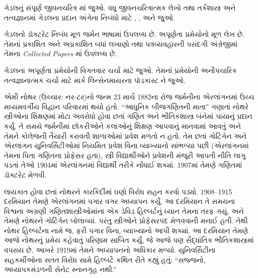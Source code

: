 \begin{reading}
ગેડલનું સંપૂર્ણ જીવનચરિત્ર
\citet{Dawson1997}માં જુઓ. વધુ જીવનચરિત્રાત્મક
લેખો તથા તર્કશાસ્ત્ર અને તત્વજ્ઞાનમાં
ગેડલના પ્રદાન અંગેના નિબંધો માટે
\citet{Wang1990}, \citet{Baaz2011},
\citet{Takeuti2003} અને \citet{Sigmund2007} જુઓ.

ગેડલનો ડૉક્ટરેટ નિબંધ મૂળ જર્મન
ભાષામાં \citep{Godel1929} ઉપલબ્ધ છે.
અપૂર્ણતા પ્રમેયોનો મૂળ લેખ
\citep{Godel1931} છે. તેમનાં
પ્રકાશિત અને અપ્રકાશિત બધાં
લખાણો તથા પત્રવ્યવહારની પસંદગી
અંગ્રેજીમાં તેમના
\emph{Collected Papers}
\citet{Godel1986,Godel1990}માં ઉપલબ્ધ છે.

ગેડલના અપૂર્ણતા પ્રમેયોની
વિગતવાર ચર્ચા માટે
\citet{Smith2013} જુઓ.
તેમનાં પ્રમેયોની અનૌપચારિક
તત્વજ્ઞાનાત્મક ચર્ચા માટે
માર્ક લિન્સેનમાયરના પૉડકાસ્ટ
\citep{Linsenmayer2014}ને જુઓ.
\end{reading}
\endgroup


\begingroup
\makeatletter{}\makeatother


\label{guunit:OLP-0626}



એમી નોથર (ઉચ્ચાર: નર-ટર)નો જન્મ 23 માર્ચ
1882ના રોજ જર્મનીના એરલાંગનમાં ઉચ્ચ
મધ્યમવર્ગીય વિદ્વાન પરિવારમાં થયો હતો.
“આધુનિક બીજગણિતની માતા” ગણાતાં નોથરે
સ્ત્રીઓના શિક્ષણમાં મોટા અવરોધો હોવા છતાં
ગણિત અને ભૌતિકશાસ્ત્ર બંનેમાં પાયાનું
પ્રદાન કર્યું. તે સમયે જર્મનીમાં છોકરીઓને
કલાઓનું શિક્ષણ આપવાનું માનવામાં આવતું અને
તેમને કોલેજની તૈયારી કરાવતી શાળાઓમાં
પ્રવેશ મળતો ન હતો. તેમ છતાં ગોટિંગેન
અને એરલાંગન યુનિવર્સિટીઓમાં નિયમિત
પ્રવેશ વિના વ્યાખ્યાનો સાંભળ્યા પછી
(એરલાંગનમાં તેમના પિતા ગણિતના પ્રોફેસર
હતા), સ્ત્રી વિદ્યાર્થીઓને પ્રવેશની
મંજૂરી આપતી નીતિ લાગુ પડતાં તેઓ
1904માં એરલાંગનમાં વિદ્યાર્થી તરીકે
નોંધાઈ શક્યાં. 1907માં તેમણે ગણિતમાં
ડૉક્ટરેટ મેળવી.

લાયકાત હોવા છતાં નોથરને કારકિર્દીમાં
ઘણો વિરોધ સહન કરવો પડ્યો. 1908--1915
દરમિયાન તેમણે એરલાંગનમાં પગાર વગર
અધ્યાપન કર્યું. આ દરમિયાન તે સમયના
વિશ્વના અગ્રણી ગણિતશાસ્ત્રીઓમાંના
એક ડેવિડ હિલ્બર્ટનું ધ્યાન તેમના
તરફ ગયું, અને તેમણે નોથરને ગોટિંગેન
બોલાવ્યાં. પરંતુ સ્ત્રીઓને પ્રોફેસરપદ
મેળવવાની મનાઈ હતી. તેથી નોથર
હિલ્બર્ટના નામે જ, ફરી પગાર વિના,
વ્યાખ્યાનો આપી શક્યાં. આ દરમિયાન
તેમણે આજે નોથરનું પ્રમેય કહેવાતું
પરિણામ સાબિત કર્યું, જે આજે પણ
સૈદ્ધાંતિક ભૌતિકશાસ્ત્રમાં વપરાય છે.
આખરે 1919માં તેમને અધ્યાપનનો
અધિકાર મળ્યો. યુનિવર્સિટીના
સહકર્મીઓના સતત વિરોધ સામે
હિલ્બર્ટે કથિત રીતે કહ્યું હતું:
“સજ્જનો, અધ્યાપકમંડળની સેનેટ
સ્નાનગૃહ નથી.”

